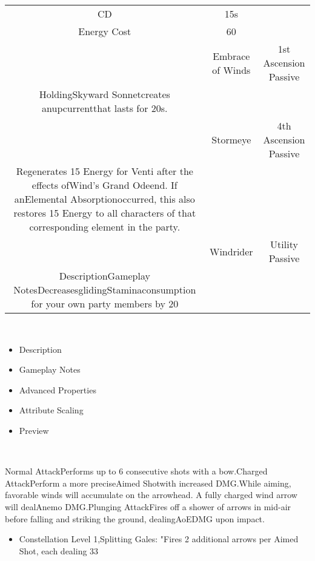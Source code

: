 \documentclass[a4paper,12pt]{article}
\begin{document}
\begin{tabular}{|c|c|c|}
CD & 15s \\
Energy Cost & 60 \\
 & Embrace of Winds & 1st Ascension Passive \\
HoldingSkyward Sonnetcreates anupcurrentthat lasts for 20s. \\
 & Stormeye & 4th Ascension Passive \\
Regenerates 15 Energy for Venti after the effects ofWind's Grand Odeend. If anElemental Absorptionoccurred, this also restores 15 Energy to all characters of that corresponding element in the party. \\
 & Windrider & Utility Passive \\
DescriptionGameplay NotesDecreasesglidingStaminaconsumption for your own party members by 20%
\end{tabular}\\ \par \vspace{0.5cm}

\begin{itemize}
\item Description
\item Gameplay Notes
\item Advanced Properties
\item Attribute Scaling
\item Preview
\end{itemize}\\ \par \vspace{0.5cm}

Normal AttackPerforms up to 6 consecutive shots with a bow.Charged AttackPerform a more preciseAimed Shotwith increased DMG.While aiming, favorable winds will accumulate on the arrowhead. A fully charged wind arrow will dealAnemo DMG.Plunging AttackFires off a shower of arrows in mid-air before falling and striking the ground, dealingAoEDMG upon impact.\\ \par \vspace{0.5cm}

\begin{itemize}
\item Constellation Level 1,Splitting Gales: "Fires 2 additional arrows per Aimed Shot, each dealing 33%
\end{itemize}\\ \par \vspace{0.5cm}
\end{document}
